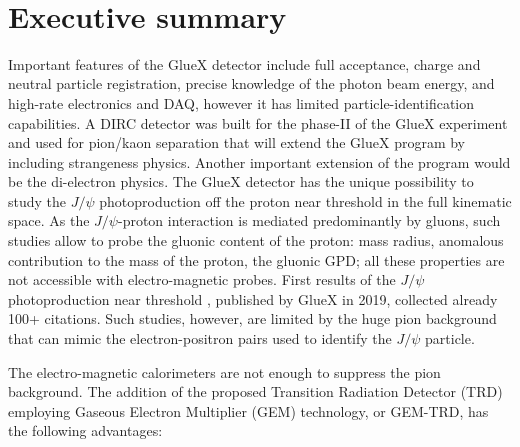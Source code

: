 \documentclass[%
preprint,
nofootinbib,
 amsmath,amssymb,
 aps,
floatfix,
]{revtex4-1}
\begin{document}
\clearpage
\mbox{~}

\section{Executive summary}

Important features of the GlueX detector include full acceptance,
charge and neutral particle registration, precise knowledge
of the photon beam energy, and high-rate
electronics and DAQ, however it has limited 
particle-identification capabilities.
A DIRC detector was built for the phase-II of the GlueX experiment 
and used for pion/kaon separation that will extend the GlueX program
by including strangeness physics.
Another important extension of the program 
would be the di-electron physics.
The GlueX detector has the unique possibility to study the $J/\psi $
photoproduction off the proton near threshold in the full kinematic space. 
As the $J/\psi $-proton interaction is mediated predominantly by gluons,
such studies allow to probe the gluonic content of the proton:
mass radius, anomalous contribution to the mass of the proton, 
the gluonic GPD; all these properties are not accessible with
electro-magnetic probes.
First results of the $J/\psi $ photoproduction near threshold \cite{prl_gluex},
published by GlueX in 2019, collected already 100+ citations. 
Such studies, however, are limited by the huge pion background
that can mimic the electron-positron pairs used to identify 
the $J/\psi $ particle. 

The electro-magnetic calorimeters are not enough to suppress 
the pion background. The addition of the proposed 
Transition Radiation Detector (TRD) employing
Gaseous Electron Multiplier (GEM) technology, or GEM-TRD,
has the following advantages:
\end{document}
